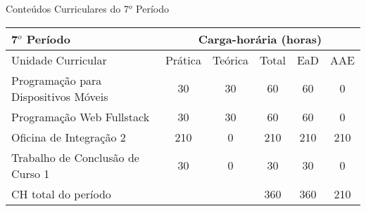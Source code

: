 \begin{quadro}[ht!]
\centering
\caption{Conteúdos Curriculares do 7$^o$ Período}\label{qua:periodo7}
\begin{tabular}{|p{8.0cm}|c|c|c|c|c|}
\hline
\rowcolor{blue1} 7$^o$ Período & \multicolumn{5}{|c|}{\centering Carga-horária (horas)} \\ \hline
\rowcolor{blue1} Unidade Curricular & Prática & Teórica & Total & EaD & AAE \\ \hline
Programação para Dispositivos Móveis & 30 & 30 & 60 & 60	&	0 \\	\hline
Programação Web Fullstack & 30 & 30 & 60 & 60	&	0 \\	\hline
Oficina de Integração 2 & 210 & 0 & 210 & 210	&	210 \\	\hline
Trabalho de Conclusão de Curso 1 & 30 & 0 & 30 & 30	&	0 \\	\hline
CH total do período & \multicolumn{2}{p{3.3cm}|}{\cellcolor{blue1}} & 360 & 360	&	210 \\ \hline
\end{tabular} \end{quadro}